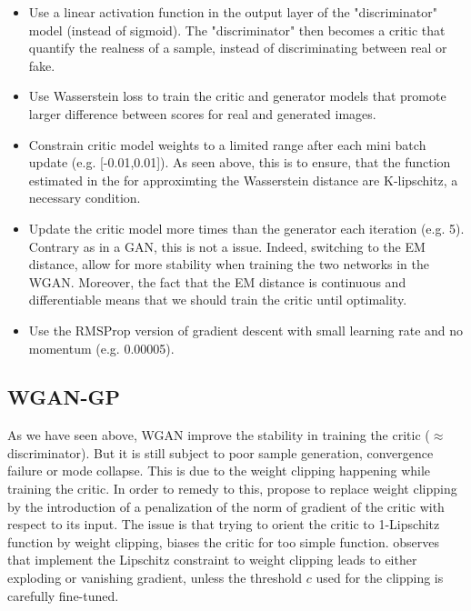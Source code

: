 \documentclass{article}
\begin{document}
\begin{itemize}
    \item Use a linear activation function in the output layer of the "discriminator" model (instead of sigmoid). The "discriminator" then becomes a critic that quantify the realness of a sample, instead of discriminating between real or fake.
    \item Use Wasserstein loss to train the critic and generator models that promote larger difference between scores for real and generated images. 
    \item Constrain critic model weights to a limited range after each mini batch update (e.g. [-0.01,0.01]). As seen above, this is to ensure, that the function estimated in the for approximting the Wasserstein distance are K-lipschitz, a necessary condition.
    \item Update the critic model more times than the generator each iteration (e.g. 5). Contrary as in a GAN, this is not a issue. Indeed, switching to the EM distance, allow for more stability when training the two networks in the WGAN. Moreover, the fact that the EM distance is continuous and differentiable means that we should train the critic until optimality.
    \item Use the RMSProp version of gradient descent with small learning rate and no momentum (e.g. 0.00005).
    
\end{itemize}



\subsection{WGAN-GP}

As we have seen above, WGAN improve the stability in training the critic ($\approx$ discriminator). But it is still subject to poor sample generation, convergence failure or mode collapse. This is due to the weight clipping happening while training the critic. In order to remedy to this, \cite{DBLP:journals/corr/GulrajaniAADC17} propose to replace weight clipping by the introduction of a penalization of the norm of gradient of the critic with respect to its input. The issue is that trying to orient the critic to 1-Lipschitz function by weight clipping, biases the critic for too simple function. \cite{DBLP:journals/corr/GulrajaniAADC17} observes that implement the Lipschitz constraint to weight clipping leads to either exploding or vanishing gradient, unless the threshold $c$ used for the clipping is carefully fine-tuned.
\end{document}
